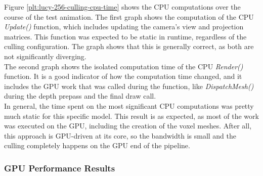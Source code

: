 \noindent
Figure \ref{plt:lucy-256-culling-cpu-time} shows the \ac{CPU} computations over the course of the test animation.
The first graph shows the computation of the \ac{CPU} \emph{Update()} function, which includes updating the camera's 
view and projection matrices. This function was expected to be static in runtime, regardless of the culling configuration. 
The graph shows that this is generally correct, as both are not significantly diverging.\\

\noindent
The second graph shows the isolated computation time of the \ac{CPU} \emph{Render()} function. It is a good indicator of 
how the computation time changed, and it includes the \ac{GPU} work that was called during the function, like 
\emph{DispatchMesh()} during the depth prepass and the final draw call. \\

\noindent
In general, the time spent on the most significant \ac{CPU} computations was pretty much static for this specific 
model. This result is as expected, as most of the work was executed on the \ac{GPU}, including the creation of the 
voxel meshes. After all, this approach is \ac{GPU}-driven at its core, so the bandwidth is small and the culling 
completely happens on the \ac{GPU} end of the pipeline.

\subsubsection*{GPU Performance Results} \label{subsubsec-gpu-performance-results-lucy}


